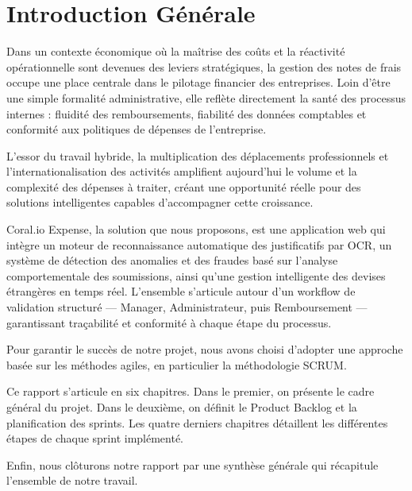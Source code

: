 \clearpage

\setcounter{page}{1}

\chapter*{Introduction Générale}

Dans un contexte économique où la maîtrise des coûts et la réactivité opérationnelle sont devenues des leviers stratégiques, la gestion des notes de frais occupe une place centrale dans le pilotage financier des entreprises. Loin d'être une simple formalité administrative, elle reflète directement la santé des processus internes : fluidité des remboursements, fiabilité des données comptables et conformité aux politiques de dépenses de l'entreprise.

L'essor du travail hybride, la multiplication des déplacements professionnels et l'internationalisation des activités amplifient aujourd'hui le volume et la complexité des dépenses à traiter, créant une opportunité réelle pour des solutions intelligentes capables d'accompagner cette croissance.

Coral.io Expense, la solution que nous proposons, est une application web qui intègre un moteur de reconnaissance automatique des justificatifs par OCR, un système de détection des anomalies et des fraudes basé sur l'analyse comportementale des soumissions, ainsi qu'une gestion intelligente des devises étrangères en temps réel. L'ensemble s'articule autour d'un workflow de validation structuré — Manager, Administrateur, puis Remboursement — garantissant traçabilité et conformité à chaque étape du processus.

Pour garantir le succès de notre projet, nous avons choisi d'adopter une approche basée sur les méthodes agiles, en particulier la méthodologie SCRUM.

Ce rapport s'articule en six chapitres. Dans le premier, on présente le cadre général du projet. Dans le deuxième, on définit le Product Backlog et la planification des sprints. Les quatre derniers chapitres détaillent les différentes étapes de chaque sprint implémenté.

Enfin, nous clôturons notre rapport par une synthèse générale qui récapitule l'ensemble de notre travail.